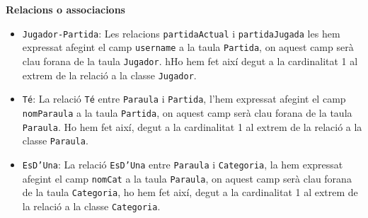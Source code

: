 \textbf{Relacions o associacions}
\begin{itemize}
	\item \texttt{Jugador-Partida}: Les relacions \texttt{partidaActual} i \texttt{partidaJugada} les hem expressat afegint el camp \texttt{username} a la taula \texttt{Partida}, on aquest camp serà clau forana de la taula \texttt{Jugador}. hHo hem fet així degut a la cardinalitat 1 al extrem de la relació a la classe \texttt{Jugador}.
	
	\item \texttt{Té}: La relació \texttt{Té} entre \texttt{Paraula} i \texttt{Partida}, l'hem expressat afegint el camp \texttt{nomParaula} a la taula \texttt{Partida}, on aquest camp serà clau forana de la taula \texttt{Paraula}. Ho hem fet així, degut a la cardinalitat 1 al extrem de la relació a la classe \texttt{Paraula}.
	
	\item \texttt{EsD’Una}: La relació \texttt{EsD’Una} entre \texttt{Paraula} i \texttt{Categoria}, la hem expressat afegint el camp \texttt{nomCat} a la taula \texttt{Paraula}, on aquest camp serà clau forana de la taula \texttt{Categoria}, ho hem fet així, degut a la cardinalitat 1 al extrem de la relació a la classe \texttt{Categoria}.
\end{itemize}

